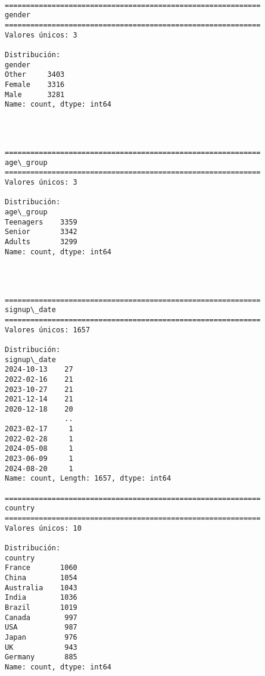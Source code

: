 \documentclass[11pt]{article}
\begin{document}
    \begin{Verbatim}[commandchars=\\\{\}]

============================================================
gender
============================================================
Valores únicos: 3

Distribución:
gender
Other     3403
Female    3316
Male      3281
Name: count, dtype: int64
    \end{Verbatim}

    \begin{center}
    \end{center}
    { \hspace*{\fill} \\}
    
    \begin{Verbatim}[commandchars=\\\{\}]

============================================================
age\_group
============================================================
Valores únicos: 3

Distribución:
age\_group
Teenagers    3359
Senior       3342
Adults       3299
Name: count, dtype: int64
    \end{Verbatim}

    \begin{center}
    \end{center}
    { \hspace*{\fill} \\}
    
    \begin{Verbatim}[commandchars=\\\{\}]

============================================================
signup\_date
============================================================
Valores únicos: 1657

Distribución:
signup\_date
2024-10-13    27
2022-02-16    21
2023-10-27    21
2021-12-14    21
2020-12-18    20
              ..
2023-02-17     1
2022-02-28     1
2024-05-08     1
2023-06-09     1
2024-08-20     1
Name: count, Length: 1657, dtype: int64

============================================================
country
============================================================
Valores únicos: 10

Distribución:
country
France       1060
China        1054
Australia    1043
India        1036
Brazil       1019
Canada        997
USA           987
Japan         976
UK            943
Germany       885
Name: count, dtype: int64
    \end{Verbatim}
\end{document}
